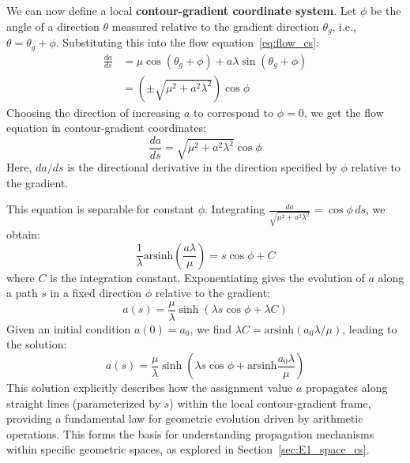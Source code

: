 \documentclass[12pt]{article}
\begin{document}
We can now define a local \textbf{contour-gradient coordinate system}. Let \( \phi \) be the angle of a direction \( \theta \) measured relative to the gradient direction \( \theta_g \), i.e., \( \theta = \theta_g + \phi \). Substituting this into the flow equation~\eqref{eq:flow_cs}:
\begin{align*}
    \frac{da}{ds} &= \mu \cos(\theta_g + \phi) + a \lambda \sin(\theta_g + \phi) \\
    &= (\pm \sqrt{\mu^2 + a^2 \lambda^2}) \cos \phi %
\end{align*}
Choosing the direction of increasing \( a \) to correspond to \( \phi = 0 \), we get the flow equation in contour-gradient coordinates:
\begin{equation}
    \frac{da}{ds} = \sqrt {\mu^2 + a^2 \lambda^2} \cos \phi \label{eq:contourgradient_cs}
\end{equation}
Here, \( da/ds \) is the directional derivative in the direction specified by \( \phi \) relative to the gradient.

This equation is separable for constant \( \phi \). Integrating \( \frac{da}{\sqrt{\mu^2 + a^2 \lambda^2}} = \cos \phi \, ds \), we obtain:
\[
\frac{1}{\lambda} \mathrm{arsinh}\left( \frac{a \lambda}{\mu} \right) = s \cos \phi + C
\]
where \( C \) is the integration constant. Exponentiating gives the evolution of \( a \) along a path \( s \) in a fixed direction \( \phi \) relative to the gradient:
\begin{equation}
  a(s) = \frac{\mu}{\lambda} \sinh(\lambda s \cos \phi + \lambda C) \label{eq:gradevo_cs}
\end{equation}
Given an initial condition \( a(0) = a_0 \), we find \( \lambda C = \mathrm{arsinh}(a_0 \lambda / \mu) \), leading to the solution:
\begin{equation}
    a(s) = \frac{\mu}{\lambda} \sinh\left(\lambda s \cos \phi + \mathrm{arsinh} \frac{a_0 \lambda}{\mu}\right) \label{eq:gradevo_initial_cs}
\end{equation}
This solution explicitly describes how the assignment value \( a \) propagates along straight lines (parameterized by \( s \)) within the local contour-gradient frame, providing a fundamental law for geometric evolution driven by arithmetic operations. This forms the basis for understanding propagation mechanisms within specific geometric spaces, as explored in Section~\ref{sec:E1_space_cs}. %
\end{document}

